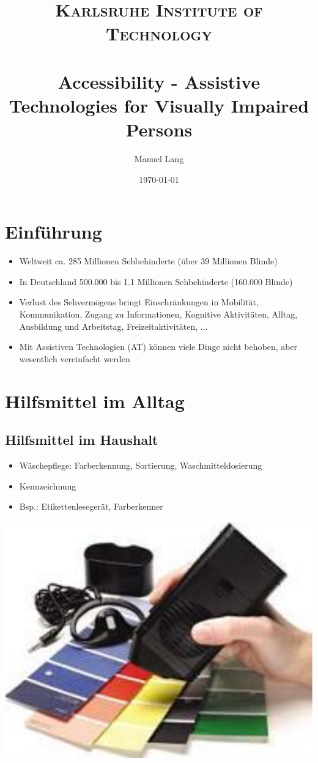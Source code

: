 \documentclass[paper=a4, fontsize=11pt]{scrartcl} %
\title{	
\normalfont \normalsize 
\textsc{Karlsruhe Institute of Technology} \\ [25pt] %
\horrule{0.5pt} \\[0.4cm] %
\huge Accessibility - Assistive Technologies for Visually Impaired Persons %
\horrule{2pt} \\[0.5cm] %
}
\author{Manuel Lang} %
\date{\normalsize\today} %
\numberwithin{equation}{section} %
\numberwithin{figure}{section} %
\numberwithin{table}{section} %
\begin{document}
\maketitle %
\newpage
\tableofcontents
\newpage

\section{Einführung}

\begin{itemize}
\item Weltweit ca. 285 Millionen Sehbehinderte (über 39 Millionen Blinde)
\item In Deutschland 500.000 bis 1.1 Millionen Sehbehinderte (160.000 Blinde)
\item Verlust des Sehvermögens bringt Einschränkungen in Mobilität, Kommunikation, Zugang zu Informationen, Kognitive Aktivitäten, Alltag, Ausbildung und Arbeitstag, Freizeitaktivitäten, ...
\item Mit Assistiven Technologien (AT) können viele Dinge nicht behoben, aber wesentlich vereinfacht werden
\end{itemize}

\section{Hilfsmittel im Alltag}

\subsection{Hilfsmittel im Haushalt}

\begin{minipage}[c]{0.55\textwidth}
\begin{itemize}
\item Wäschepflege: Farberkennung, Sortierung, Waschmitteldosierung
\item Kennzeichnung
\item Bsp.: Etikettenlesegerät, Farberkenner
\end{itemize}
\end{minipage}
\begin{minipage}[c]{0.3\textwidth}
\includegraphics[width=\textwidth]{imgs/farbleser}
\end{minipage}
\end{document}
